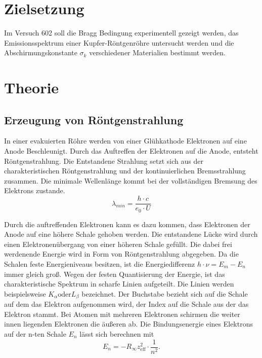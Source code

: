 \section{Zielsetzung}
\label{sec:Zielsetzung}

Im Versuch 602 soll die Bragg Bedingung experimentell gezeigt werden, das Emissionsspektrum einer Kupfer-Röntgenröhre untersucht werden
und die Abschirmungskonstante $σ_k$ verschiedener Materialien bestimmt werden.

\section{Theorie}
\label{sec:Theorie}

\subsection{Erzeugung von Röntgenstrahlung}
\label{sec:Erzeugung_von_Roentgenstrahlung}

In einer evakuierten Röhre werden von einer Glühkathode Elektronen auf eine Anode Beschleunigt. 
Durch das Auftreffen der Elektronen auf die Anode, entsteht Röntgenstrahlung. Die Entstandene Strahlung
setzt sich aus der charakteristischen Röntgenstrahlung und der kontinuierlichen Bremsstrahlung zusammen. 
Die minimale Wellenlänge kommt bei der vollständigen Bremsung des Elektrons zustande.\\
\begin{equation*}\label{eq:lambda_min}
    \lambda_{min} = \frac{h \cdot c}{e_0 \cdot U}
\end{equation*}

Durch die auftreffenden Elektronen kann es dazu kommen, dass Elektronen der Anode auf eine höhere Schale 
gehoben werden. Die entstandene Lücke wird durch einen Elektronenübergang von einer höheren Schale gefüllt.
Die dabei frei werdenende Energie wird in Form von Röntgenstrahlung abgegeben. Da die Schalen feste Energieniveaus besitzen,
ist die Energiedifferenz $h \cdot ν = E_m - E_n$ immer gleich groß. Wegen der festen Quantisierung der Energie,
ist das charakteristische Spektrum in scharfe Linien aufgeteilt.
Die Linien werden beispielsweise $K_α \text{oder} L_β$ bezeichnet. Der Buchstabe bezieht sich auf die 
Schale auf dem das Elektron aufgenommen wird, der Index auf die Schale aus der das Elektron stammt.
Bei Atomen mit mehreren Elektronen schirmen die weiter innen liegenden Elektronen die äußeren ab.
Die Bindungsenergie eines Elektrons auf der n-ten Schale $E_n$ lässt sich berechnen mit
\begin{equation*}\label{eq:Bindungsenergie}
    E_n = -R_\infty z_{\text{eff}}^2 \cdot \frac{1}{n^2}.
\end{equation*}




